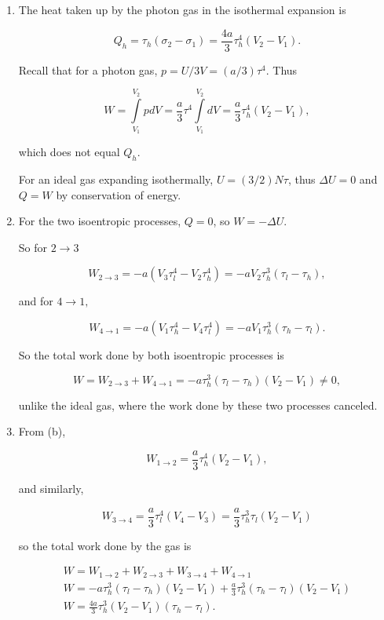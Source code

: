 \documentclass{article}
\begin{document}
\begin{enumerate}
\begin{enumerate}
		\item

		The heat taken up by the photon gas in the isothermal expansion is

		$$Q_h = \tau_h (\sigma_2 - \sigma_1) = \frac{4a}{3}\tau_h^4(V_2 - V_1).$$

		Recall that for a photon gas, $p = U/3V = (a/3) \tau^4$. Thus 

		$$W = \int \limits_{V_1}^{V_2} pdV = \frac{a}{3} \tau^4 \int \limits_{V_1}^{V_2} dV = \frac{a}{3}\tau_h^4(V_2 - V_1),$$

		which does not equal $Q_h$.

		For an ideal gas expanding isothermally, $U = (3/2)N \tau$, thus $\Delta U = 0$ and $Q = W$ by conservation of energy.

		\item

		For the two isoentropic processes, $Q = 0$, so $W = -\Delta U$.

		So for $2 \to 3$

		$$W_{2 \to 3} = -a(V_3 \tau_l^4 - V_2 \tau_h^4) = -aV_2 \tau_h^3 (\tau_l - \tau_h),$$

		and for $4 \to 1,$

		$$W_{4 \to 1} = -a(V_1 \tau_h^4 - V_4 \tau_l^4) = -aV_1 \tau_h^3 (\tau_h - \tau_l).$$

		So the total work done by both isoentropic processes is

		$$W = W_{2 \to 3} + W_{4 \to 1} = -a\tau_h^3(\tau_l - \tau_h)(V_2 - V_1) \neq 0,$$

		unlike the ideal gas, where the work done by these two processes canceled.

		\item

		From (b),

		$$W_{1 \to 2} = \frac{a}{3}\tau_h^4(V_2 - V_1),$$

		and similarly,

		$$W_{3 \to 4} = \frac{a}{3}\tau_l^4(V_4 - V_3) = \frac{a}{3}\tau_h^3 \tau_l (V_2 - V_1)$$

		so the total work done by the gas is

		\begin{gather*}
		W = W_{1 \to 2} + W_{2 \to 3} + W_{3 \to 4} + W_{4 \to 1} \\
		W = -a\tau_h^3(\tau_l - \tau_h)(V_2 - V_1) + \frac{a}{3} \tau_h^3 (\tau_h - \tau_l)(V_2 - V_1) \\
		W = \frac{4a}{3} \tau_h^3 (V_2 - V_1) (\tau_h - \tau_l).
		\end{gather*}


\end{enumerate}
\end{enumerate}
\end{document}
